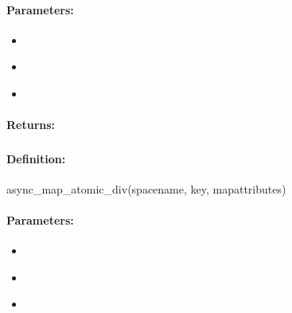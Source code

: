 \paragraph{Parameters:}
\begin{itemize}[noitemsep]
\item {}\\

\item {}\\

\item {}\\

\end{itemize}

\paragraph{Returns:}


\pagebreak
\subsubsection{}
\label{api:ruby:async_map_atomic_div}


\paragraph{Definition:}
\begin{rubycode}
async_map_atomic_div(spacename, key, mapattributes)
\end{rubycode}

\paragraph{Parameters:}
\begin{itemize}[noitemsep]
\item {}\\

\item {}\\

\item {}\\

\end{itemize}

